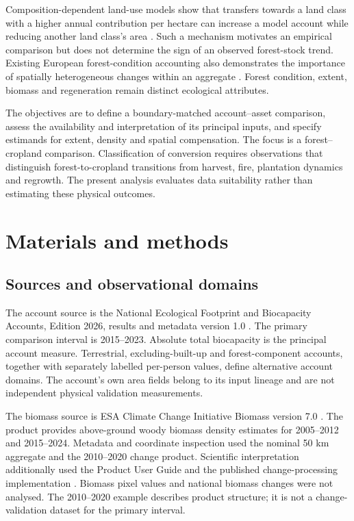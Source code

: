 \documentclass[11pt,a4paper]{article}
\begin{document}
Composition-dependent land-use models show that transfers towards a land class with a higher annual contribution per hectare can increase a model account while reducing another land class's area \citep{Abaee2026}. Such a mechanism motivates an empirical comparison but does not determine the sign of an observed forest-stock trend. Existing European forest-condition accounting also demonstrates the importance of spatially heterogeneous changes within an aggregate \citep{Maes2023}. Forest condition, extent, biomass and regeneration remain distinct ecological attributes.

The objectives are to define a boundary-matched account--asset comparison, assess the availability and interpretation of its principal inputs, and specify estimands for extent, density and spatial compensation. The focus is a forest--cropland comparison. Classification of conversion requires observations that distinguish forest-to-cropland transitions from harvest, fire, plantation dynamics and regrowth. The present analysis evaluates data suitability rather than estimating these physical outcomes.

\section{Materials and methods}
\subsection{Sources and observational domains}
The account source is the National Ecological Footprint and Biocapacity Accounts, Edition 2026, results and metadata version 1.0 \citep{Lo2026}. The primary comparison interval is 2015--2023. Absolute total biocapacity is the principal account measure. Terrestrial, excluding-built-up and forest-component accounts, together with separately labelled per-person values, define alternative account domains. The account's own area fields belong to its input lineage and are not independent physical validation measurements.

The biomass source is ESA Climate Change Initiative Biomass version 7.0 \citep{SantoroCartus2026}. The product provides above-ground woody biomass density estimates for 2005--2012 and 2015--2024. Metadata and coordinate inspection used the nominal 50 km aggregate and the 2010--2020 change product. Scientific interpretation additionally used the Product User Guide and the published change-processing implementation \citep{PUG2026}. Biomass pixel values and national biomass changes were not analysed. The 2010--2020 example describes product structure; it is not a change-validation dataset for the primary interval.
\end{document}
